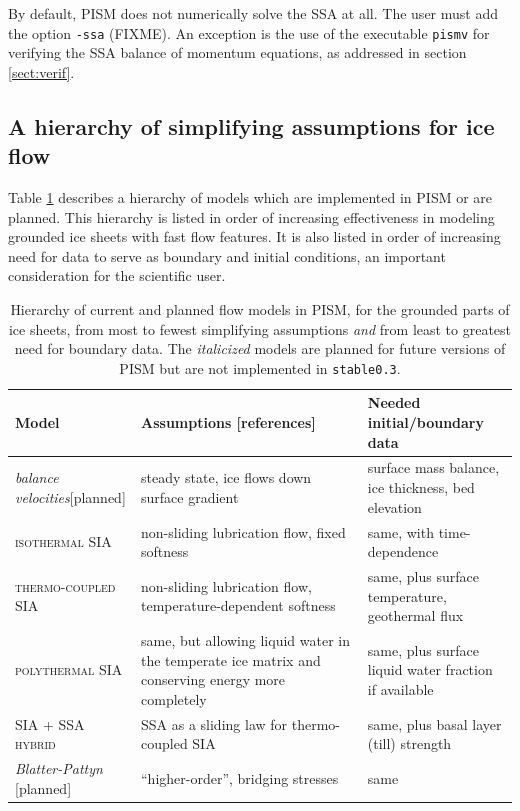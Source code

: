 \documentclass[11pt,final]{amsart}
\newcommand{\pismoptionindex}[1]{\index{options for PISM (and PETSc)!\texttt{-#1}}}
\newcommand{\intextoption}[1]{\texttt{-#1}\pismoptionindex{#1}}
\begin{document}
By default, PISM does not numerically solve the SSA at all.  The user must add the option \intextoption{ssa} (FIXME).  An exception is the use of the executable \verb|pismv| for verifying the SSA balance of momentum equations, as addressed in section \ref{sect:verif}.


\subsection{A hierarchy of simplifying assumptions for ice flow}\label{sec:model-hierarchy}   Table \ref{tab:modelhierarchy} describes a hierarchy of models which are implemented in PISM or are planned.  This hierarchy is listed in order of increasing effectiveness in modeling grounded ice sheets with fast flow features.  It is also listed in order of increasing need for data to serve as boundary and initial conditions, an important consideration for the scientific user.

\begin{table}[ht]
\caption{Hierarchy of current and planned flow models in PISM, for the grounded parts of ice sheets, from most to fewest simplifying assumptions \emph{and} from least to greatest need for boundary data.  The \emph{italicized} models are planned for future versions of PISM but are not implemented in \texttt{stable0.3}.}\label{tab:modelhierarchy} 
\small
\begin{tabular}{p{0.25\linewidth}p{0.45\linewidth}p{0.35\linewidth}}\hline
\textbf{Model} & \textbf{Assumptions [references]} & \textbf{Needed initial/boundary data} \\ \hline
\emph{balance velocities}\tiny[planned]\small & steady state, ice flows down surface gradient \cite{JoughinetalGrBal97} & surface mass balance, ice  thickness, bed elevation \\
\textsc{isothermal SIA} & non-sliding lubrication flow, fixed softness \cite{BLKCB,EISMINT96} & same, with time-dependence \\
\textsc{thermo-coupled SIA} & non-sliding lubrication flow, temperature-dependent softness \cite{BBL,EISMINT00} & same, plus surface temperature,  geothermal flux \\
\textsc{polythermal SIA} & same, but allowing liquid water in the temperate ice matrix and conserving energy more completely \cite{AschwandenBlatter,Greve} & same, plus surface liquid water fraction if available \\
\textsc{SIA + SSA hybrid} & SSA as a sliding law for thermo-coupled SIA \cite{BBssasliding} & same, plus basal layer (till) strength \\
\emph{Blatter-Pattyn} \tiny[planned]\small & ``higher-order'', bridging stresses \cite{Blatter,Pattyn03,SchoofCoulombBlatter} & same \\ \hline
\end{tabular}
\normalsize
\end{table}
\end{document}

